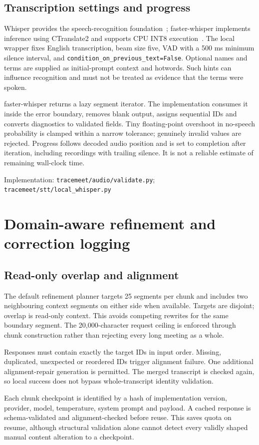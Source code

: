 \documentclass[11pt,a4paper]{article}
\newcommand{\code}[1]{\nolinkurl{#1}}
\newcommand{\src}[1]{\par{\footnotesize\raggedright\textcolor{accent}{Implementation:} #1\par}}
\begin{document}
\subsection{Transcription settings and progress}
Whisper provides the speech-recognition foundation~\cite{whisper}; faster-whisper implements inference using CTranslate2 and supports CPU INT8 execution~\cite{faster}. The local wrapper fixes English transcription, beam size five, VAD with a 500 ms minimum silence interval, and \code{condition_on_previous_text=False}. Optional names and terms are supplied as initial-prompt context and hotwords. Such hints can influence recognition and must not be treated as evidence that the terms were spoken.

faster-whisper returns a lazy segment iterator. The implementation consumes it inside the error boundary, removes blank output, assigns sequential IDs and converts diagnostics to validated fields. Tiny floating-point overshoot in no-speech probability is clamped within a narrow tolerance; genuinely invalid values are rejected. Progress follows decoded audio position and is set to completion after iteration, including recordings with trailing silence. It is not a reliable estimate of remaining wall-clock time.
\src{\code{tracemeet/audio/validate.py}; \code{tracemeet/stt/local_whisper.py}}

\section{Domain-aware refinement and correction logging}
\subsection{Read-only overlap and alignment}
The default refinement planner targets 25 segments per chunk and includes two neighbouring context segments on either side when available. Targets are disjoint; overlap is read-only context. This avoids competing rewrites for the same boundary segment. The 20,000-character request ceiling is enforced through chunk construction rather than rejecting every long meeting as a whole.

Responses must contain exactly the target IDs in input order. Missing, duplicated, unexpected or reordered IDs trigger alignment failure. One additional alignment-repair generation is permitted. The merged transcript is checked again, so local success does not bypass whole-transcript identity validation.

Each chunk checkpoint is identified by a hash of implementation version, provider, model, temperature, system prompt and payload. A cached response is schema-validated and alignment-checked before reuse. This saves quota on resume, although structural validation alone cannot detect every validly shaped manual content alteration to a checkpoint.
\end{document}
